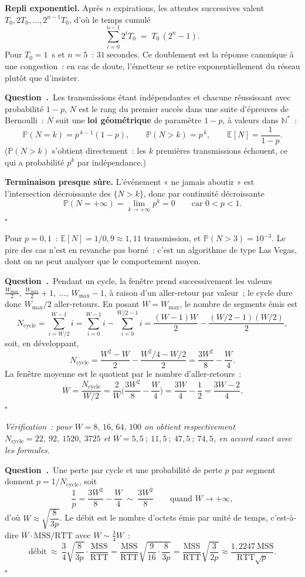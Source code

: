 \documentclass[11pt,a4paper]{article}
\renewcommand{\Q}{\medskip\par\stepcounter{qcnt}\noindent\textbf{\color{cnc}Question~\theqcnt.}~}
\begin{document}
\textbf{Repli exponentiel.} Après $n$ expirations, les attentes successives valent
$T_0,2T_0,\dots,2^{n-1}T_0$, d'où le temps cumulé
\[ \sum_{i=0}^{n-1}2^{i}T_0 \;=\; T_0\,(2^{n}-1). \]
Pour $T_0=1$~s et $n=5$~: $\boxed{31\ \text{secondes}}$. Ce doublement est la réponse
canonique à une congestion~: en cas de doute, l'émetteur se retire exponentiellement du
réseau plutôt que d'insister.

\Q Les transmissions étant indépendantes et chacune réussissant avec probabilité $1-p$,
$N$ est le rang du premier succès dans une suite d'épreuves de Bernoulli~: $N$ suit une
\textbf{loi géométrique} de paramètre $1-p$, à valeurs dans $\mathbb{N}^{*}$~:
\[ \mathbb{P}(N=k)=p^{\,k-1}(1-p),\qquad \mathbb{P}(N>k)=p^{\,k},\qquad
   \mathbb{E}[N]=\frac{1}{1-p}. \]
($\mathbb{P}(N>k)$ s'obtient directement~: les $k$ premières transmissions échouent, ce qui a
probabilité $p^{k}$ par indépendance.)

\textbf{Terminaison presque sûre.} L'événement « ne jamais aboutir » est l'intersection
décroissante des $\{N>k\}$, donc par continuité décroissante
\[ \mathbb{P}(N=+\infty)=\lim_{k\to+\infty}p^{k}=0 \qquad\text{car } 0<p<1. \]
\hfill$\square$

Pour $p=0{,}1$~: $\mathbb{E}[N]=1/0{,}9\approx\boxed{1{,}11}$ transmission, et
$\mathbb{P}(N>3)=10^{-3}$. Le pire des cas n'est en revanche pas borné~: c'est un algorithme
de type Las Vegas, dont on ne peut analyser que le comportement moyen.

\Q Pendant un cycle, la fenêtre prend successivement les valeurs
$\frac{W_{\max}}{2},\ \frac{W_{\max}}{2}+1,\ \dots,\ W_{\max}-1$, à raison d'un
aller-retour par valeur~; le cycle dure donc $W_{\max}/2$ aller-retours. En posant
$W=W_{\max}$, le nombre de segments émis est
\[ N_{\text{cycle}}=\sum_{i=W/2}^{W-1} i
 =\sum_{i=0}^{W-1}i-\sum_{i=0}^{W/2-1}i
 =\frac{(W-1)W}{2}-\frac{(W/2-1)(W/2)}{2}, \]
soit, en développant,
\[ N_{\text{cycle}}=\frac{W^2-W}{2}-\frac{W^2/4-W/2}{2}
 =\boxed{\frac{3W^{2}}{8}-\frac{W}{4}} . \]
La fenêtre moyenne est le quotient par le nombre d'aller-retours~:
\[ \overline{W}=\frac{N_{\text{cycle}}}{W/2}
 =\frac{2}{W}\Big(\frac{3W^2}{8}-\frac{W}{4}\Big)=\frac{3W}{4}-\frac{1}{2}
 =\boxed{\frac{3W-2}{4}} . \]
\hfill$\square$

\emph{Vérification~: pour $W=8,\,16,\,64,\,100$ on obtient respectivement
$N_{\text{cycle}}=22,\ 92,\ 1520,\ 3725$ et $\overline{W}=5{,}5\ ;\ 11{,}5\ ;\ 47{,}5\ ;\
74{,}5$, en accord exact avec les formules.}

\Q Une perte par cycle et une probabilité de perte $p$ par segment donnent
$p=1/N_{\text{cycle}}$, soit
\[ \frac{1}{p}=\frac{3W^{2}}{8}-\frac{W}{4}\ \sim\ \frac{3W^{2}}{8}
   \qquad\text{quand } W\to+\infty, \]
d'où $W\approx\sqrt{\dfrac{8}{3p}}$. Le débit est le nombre d'octets émis par unité de temps,
c'est-à-dire $\overline{W}\cdot\mathrm{MSS}/\mathrm{RTT}$ avec
$\overline{W}\sim\frac{3}{4}W$~:
\[ \text{débit}\ \approx\ \frac{3}{4}\sqrt{\frac{8}{3p}}\cdot
   \frac{\mathrm{MSS}}{\mathrm{RTT}}
  =\frac{\mathrm{MSS}}{\mathrm{RTT}}\sqrt{\frac{9}{16}\cdot\frac{8}{3p}}
  =\frac{\mathrm{MSS}}{\mathrm{RTT}}\sqrt{\frac{3}{2p}}
  \approx\frac{1{,}2247\ \mathrm{MSS}}{\mathrm{RTT}\sqrt{p}} . \]
\hfill$\square$
\end{document}

